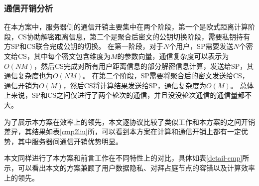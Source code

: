 \subsubsection{通信开销分析}
在本方案中，服务器侧的通信开销主要集中在两个阶段，第一个是欧式距离计算阶段，CS协助解密距离信息，第二个是聚合后密文的公钥切换阶段，需要私钥持有方SP和CS联合完成公钥的切换。
在第一阶段，对于$N$个用户，SP需要发送$N$个密文给CS，其中每个密文包含维度为$M$的参数向量，通信复杂度可以表示为$O(NM)$，然后CS完成对所有用户距离信息的部分解密信息计算，发送给SP，其通信复杂度也为$O(NM)$。
在第二个阶段，SP需要将聚合后的密文发送给CS，通信开销为$O(M)$，然后CS将计算结果发送给SP，通信复杂度为$O(M)$。
总体上来说，SP和CS之间仅进行了两个轮次的通信，并且没没轮次通信的通信量都不大。

为了展示本方案在效率上的领先，本文逐协议比较了类似工作\cite{liu2021privacy}和本方案的之间开销差异，其结果如表\ref{cmp2liu}所，可以看到本方案在计算和通信开销上都有一定优势，其中服务器间通信开销优势明显。

本文同样进行了本方案和前言工作在不同特性上的对比，具体如表\ref{detail-cmp}所示，可以看出本文的方案兼顾了用户数据隐私、对拜占庭节点的容错以及计算效率上的领先。

\begin{table}
	\centering
	\caption{与文献\parencite{liu2021privacy}在计算和通信开销上的对比}
	\label{cmp2liu}
\end{table}


